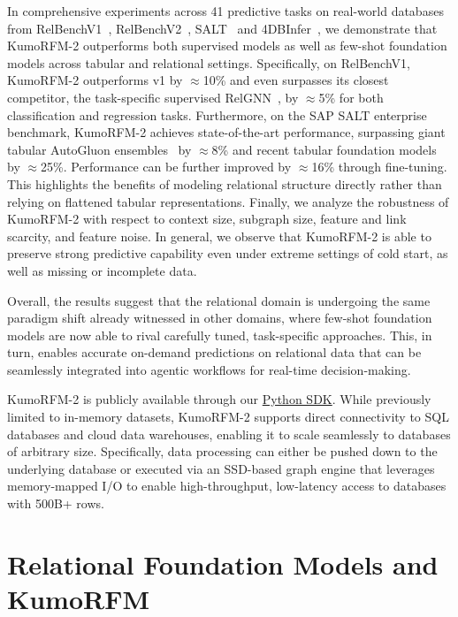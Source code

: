 \documentclass{article}
\newcommand{\onezero}{1\xspace}
\newcommand{\twozero}{2\xspace}
\newcommand{\name}{KumoRFM\xspace}
\newcommand{\nametwo}{\name-\twozero}
\begin{document}
In comprehensive experiments across 41 predictive tasks on real-world databases from RelBenchV1~\citep{relbench}, RelBenchV2~\citep{gu2026relbenchv2}, SALT~\citep{salt} and 4DBInfer~\citep{wang2024dbinfer}, we demonstrate that \nametwo outperforms both supervised models as well as few-shot foundation models across tabular and relational settings.
Specifically, on RelBenchV1, \nametwo outperforms v\onezero by $\approx$10\% and even surpasses its closest competitor, the task-specific supervised RelGNN~\citep{relgnn}, by $\approx$5\% for both classification and regression tasks.
Furthermore, on the SAP SALT enterprise benchmark, \nametwo achieves state-of-the-art performance, surpassing giant tabular AutoGluon ensembles~\citep{autogluon} by $\approx$8\% and recent tabular foundation models~\citep{qu2026tabiclv2} by $\approx$25\%.
Performance can be further improved by $\approx$16\% through fine-tuning.
This highlights the benefits of modeling relational structure directly rather than relying on flattened tabular representations.
Finally, we analyze the robustness of \nametwo with respect to context size, subgraph size, feature and link scarcity, and feature noise.
In general, we observe that \nametwo is able to preserve strong predictive capability even under extreme settings of cold start, as well as missing or incomplete data.

Overall, the results suggest that the relational domain is undergoing the same paradigm shift already witnessed in other domains, where few-shot foundation models are now able to rival carefully tuned, task-specific approaches.
This, in turn, enables accurate on-demand predictions on relational data that can be seamlessly integrated into agentic workflows for real-time decision-making.

\nametwo is publicly available through our \href{https://kumorfm.ai}{Python SDK}.
While previously limited to in-memory datasets, \nametwo supports direct connectivity to SQL databases and cloud data warehouses, enabling it to scale seamlessly to databases of arbitrary size.
Specifically, data processing can either be pushed down to the underlying database or executed via an SSD-based graph engine that leverages memory-mapped I/O to enable high-throughput, low-latency access to databases with 500B+ rows.

\section{Relational Foundation Models and \name}
\label{sec:rfm}
\end{document}
